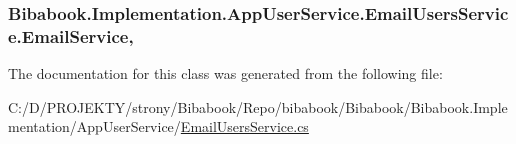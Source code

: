 \subsubsection[{Email\+Service}]{ Bibabook.\+Implementation.\+App\+User\+Service.\+Email\+Users\+Service.\+Email\+Service\hspace{0.3cm}{\ttfamily [get]}, {\ttfamily [set]}}\label{class_bibabook_1_1_implementation_1_1_app_user_service_1_1_email_users_service_a9d0e2425374cd78f72ff2c959739fe86}


The documentation for this class was generated from the following file\+:\begin{DoxyCompactItemize}
\item 
C\+:/\+D/\+P\+R\+O\+J\+E\+K\+T\+Y/strony/\+Bibabook/\+Repo/bibabook/\+Bibabook/\+Bibabook.\+Implementation/\+App\+User\+Service/\hyperlink{_email_users_service_8cs}{Email\+Users\+Service.\+cs}\end{DoxyCompactItemize}
